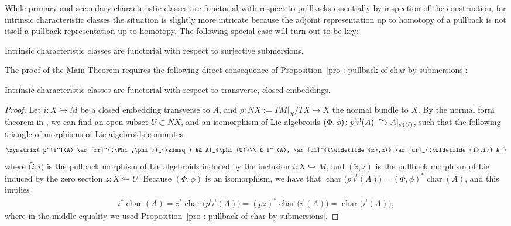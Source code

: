 \documentclass[pdftex]{sigma}
\numberwithin{equation}{section}
\newcommand{\diffto}{\xrightarrow{\raisebox{-0.2 em}[0pt][0pt]{\smash{\ensuremath{\sim}}}}}
\newcommand{\inc}{\hookrightarrow}
\newcommand{\8}{\infty}
\begin{document}
While primary and secondary characteristic classes are functorial with respect to pullbacks essentially by inspection of the construction, for intrinsic characteristic classes the situation is slightly more intricate because the adjoint representation up to homotopy of a pullback is not itself a pullback representation up to homotopy. The following special case will turn out to be key:

\begin{proposition}\label{pro : pullback of char by submersions}
 Intrinsic characteristic classes are functorial with respect to surjective submersions.
\end{proposition}

The proof of the Main Theorem requires the following direct consequence of Proposition~\ref{pro : pullback of char by submersions}:

\begin{proposition}\label{pro : pullback of char by inclusion}
 Intrinsic characteristic classes are functorial with respect to transverse, closed embeddings.
\end{proposition}
\begin{proof}Let $i\colon X \inc M$ be a closed embedding transverse to $A$, and $p\colon NX:=TM|_X/TX \to X$ the normal bundle to $X$. By the normal form theorem in \cite{BLM}, we can find an open subset $U \subset NX$, and an isomorphism of Lie algebroids $(\Phi,\phi) \colon p^!i^!(A) \diffto A|_{\phi(U)}$, such that the following triangle of morphisms of Lie algebroids commutes
\begin{gather*}
 \xymatrix{
 p^!i^!(A) \ar[rr]^{(\Phi,\phi)}_{\simeq} && A|_{\phi(U)}\\
 & i^!(A), \ar[ul]^{(\widetilde{z},z)} \ar[ur]_{(\widetilde{i},i)} &
 }
\end{gather*}where $\big(\widetilde{i},i\big)$ is the pullback morphism of Lie algebroids induced by the inclusion $i\colon X \inc M$, and $(\widetilde{z},z)$ is the pullback morphism of Lie induced by the zero section $z\colon X \inc U$. Because $(\Phi,\phi)$ is an isomorphism, we have that $\operatorname{char}\big(p^!i^!(A)\big) = (\Phi,\phi)^*\operatorname{char}(A)$, and this implies
\begin{gather*}
 i^*\operatorname{char}(A) = z^*\operatorname{char}\big(p^!i^!(A)\big) =(pz)^*\operatorname{char}\big(i^!(A)\big) = \operatorname{char}\big(i^!(A)\big),
\end{gather*}where in the middle equality we used Proposition~\ref{pro : pullback of char by submersions}.
\end{proof}
\end{document}
